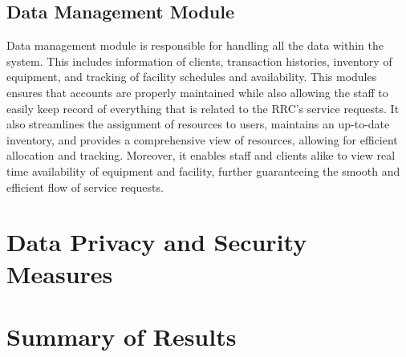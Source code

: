 \subsection{Data Management Module}

Data management module is responsible for handling all the data within the system. This includes information of clients, transaction histories, inventory of equipment, and tracking of facility schedules and availability. This modules ensures that accounts are properly maintained while also allowing the staff to easily keep record of everything that is related to the RRC's service requests. It also streamlines the assignment of resources to users, maintains an up-to-date inventory, and provides a comprehensive view of resources, allowing for efficient allocation and tracking. Moreover, it enables staff and clients alike to view real time availability of equipment and facility, further guaranteeing the smooth and efficient flow of  service requests.

\section{Data Privacy and Security Measures}

\section{Summary of Results}

